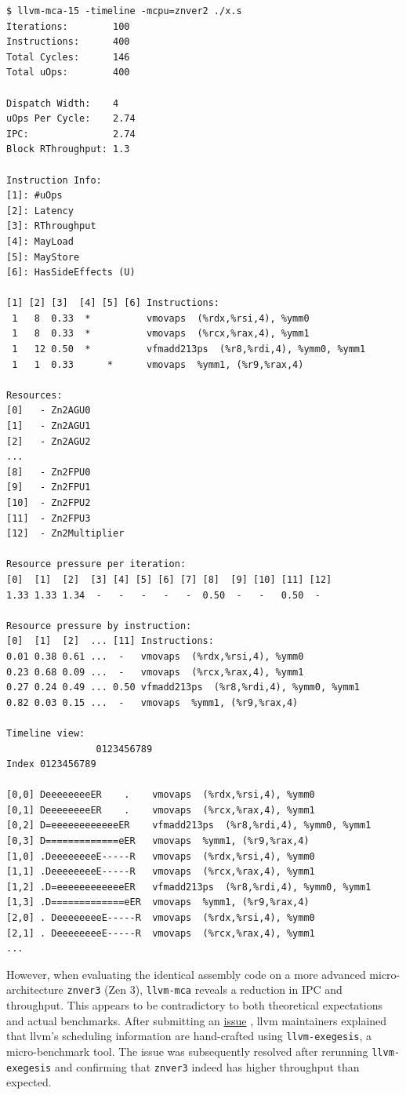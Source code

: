 \documentclass[logo,bsc,singlespacing,parskip]{infthesis}
\newcommand{\mca}{\texttt{llvm-mca}}
\newcommand{\exegesis}{\texttt{llvm-exegesis}}
\begin{document}
\begin{verbatim}
$ llvm-mca-15 -timeline -mcpu=znver2 ./x.s 
Iterations:        100
Instructions:      400
Total Cycles:      146
Total uOps:        400

Dispatch Width:    4
uOps Per Cycle:    2.74
IPC:               2.74
Block RThroughput: 1.3

Instruction Info:
[1]: #uOps
[2]: Latency
[3]: RThroughput
[4]: MayLoad
[5]: MayStore
[6]: HasSideEffects (U)

[1] [2] [3]  [4] [5] [6] Instructions:
 1   8  0.33  *          vmovaps  (%rdx,%rsi,4), %ymm0
 1   8  0.33  *          vmovaps  (%rcx,%rax,4), %ymm1
 1   12 0.50  *          vfmadd213ps  (%r8,%rdi,4), %ymm0, %ymm1
 1   1  0.33      *      vmovaps  %ymm1, (%r9,%rax,4)

Resources:
[0]   - Zn2AGU0
[1]   - Zn2AGU1
[2]   - Zn2AGU2
...
[8]   - Zn2FPU0
[9]   - Zn2FPU1
[10]  - Zn2FPU2
[11]  - Zn2FPU3
[12]  - Zn2Multiplier

Resource pressure per iteration:
[0]  [1]  [2]  [3] [4] [5] [6] [7] [8]  [9] [10] [11] [12]   
1.33 1.33 1.34  -   -   -   -   -  0.50  -   -   0.50  -     

Resource pressure by instruction:
[0]  [1]  [2]  ... [11] Instructions:
0.01 0.38 0.61 ...  -   vmovaps  (%rdx,%rsi,4), %ymm0
0.23 0.68 0.09 ...  -   vmovaps  (%rcx,%rax,4), %ymm1
0.27 0.24 0.49 ... 0.50 vfmadd213ps  (%r8,%rdi,4), %ymm0, %ymm1
0.82 0.03 0.15 ...  -   vmovaps  %ymm1, (%r9,%rax,4)

Timeline view:
                0123456789      
Index 0123456789           

[0,0] DeeeeeeeeER    .    vmovaps  (%rdx,%rsi,4), %ymm0
[0,1] DeeeeeeeeER    .    vmovaps  (%rcx,%rax,4), %ymm1
[0,2] D=eeeeeeeeeeeeER    vfmadd213ps  (%r8,%rdi,4), %ymm0, %ymm1
[0,3] D=============eER   vmovaps  %ymm1, (%r9,%rax,4)
[1,0] .DeeeeeeeeE-----R   vmovaps  (%rdx,%rsi,4), %ymm0
[1,1] .DeeeeeeeeE-----R   vmovaps  (%rcx,%rax,4), %ymm1
[1,2] .D=eeeeeeeeeeeeER   vfmadd213ps  (%r8,%rdi,4), %ymm0, %ymm1
[1,3] .D=============eER  vmovaps  %ymm1, (%r9,%rax,4)
[2,0] . DeeeeeeeeE-----R  vmovaps  (%rdx,%rsi,4), %ymm0
[2,1] . DeeeeeeeeE-----R  vmovaps  (%rcx,%rax,4), %ymm1
...

\end{verbatim}

However, when evaluating the identical assembly code on a more advanced micro-architecture \texttt{znver3} (Zen 3), \mca{} reveals a reduction in IPC and throughput. This appears to be contradictory to both theoretical expectations and actual benchmarks. After submitting an \href{https://github.com/llvm/llvm-project/issues/59325}{issue} \cite{mca-issue}, llvm maintainers explained that llvm's scheduling information are hand-crafted using \exegesis{}, a micro-benchmark tool. The issue was subsequently resolved after rerunning \exegesis{} and confirming that \texttt{znver3} indeed has higher throughput than expected. 
\end{document}

